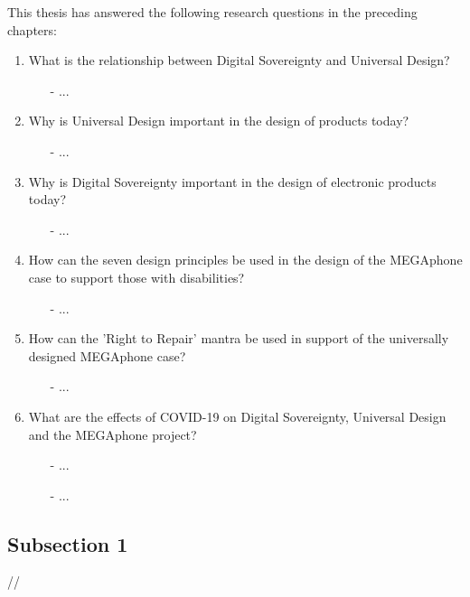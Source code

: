 This thesis has answered the following research questions in the preceding chapters:
\begin{enumerate}
    \item What is the relationship between Digital Sovereignty and Universal Design?
        \begin{enumerate}
        \item[-] ...
        \end{enumerate} 
    \item Why is Universal Design important in the design of products today?
        \begin{enumerate}
        \item[-] ...
        \end{enumerate}
    \item Why is Digital Sovereignty important in the design of electronic products today?
        \begin{enumerate}
        \item[-] ...
        \end{enumerate} 
    \item How can the seven design principles be used in the design of the MEGAphone case to support those with disabilities?
        \begin{enumerate}
        \item[-] ...
        \end{enumerate} 
    \item How can the 'Right to Repair' mantra be used in support of the universally designed MEGAphone case?
        \begin{enumerate}
        \item[-] ...
        \end{enumerate} 
    \item What are the effects of COVID-19 on Digital Sovereignty, Universal Design and the MEGAphone project?
        \begin{enumerate}
        \item[-] ...
        \item[-] ...
        \end{enumerate} 
\end{enumerate}

\subsection{Subsection 1}
//

